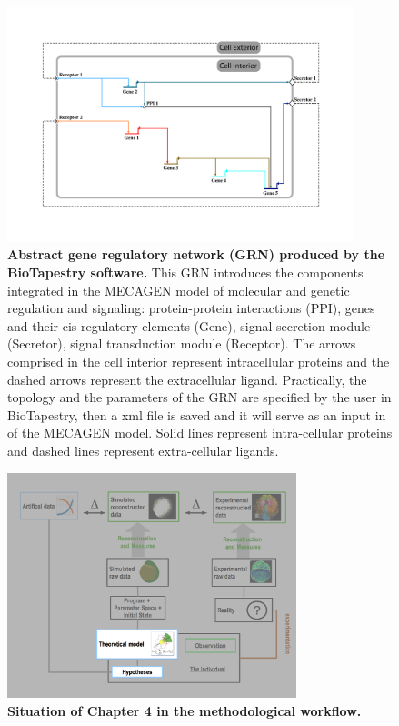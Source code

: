 \begin{figure}
\begin{center}
\includegraphics[width=0.9\textwidth]{../../images/Cases_Studies/Case_theo_grn/generic_grn_cellshape.png}
\end{center}
\caption{\textbf{Abstract gene regulatory network (GRN) produced by the BioTapestry software.} This GRN introduces the components integrated in the MECAGEN model of molecular and genetic regulation and signaling: protein-protein interactions (PPI), genes and their cis-regulatory elements (Gene), signal secretion module (Secretor), signal transduction module (Receptor). The arrows comprised in the cell interior represent intracellular proteins and the dashed arrows represent the extracellular ligand. Practically, the topology and the parameters of the GRN are specified by the user in BioTapestry, then a xml file is saved and it will serve as an input in of the MECAGEN model. Solid lines represent intra-cellular proteins and dashed lines represent extra-cellular ligands.}
\label{Case_theo_grn_generic_grn_cell_shape}
\end{figure}
\begin{figure}
\begin{center}
\includegraphics[width=0.75\textwidth]{../../images/experimental_science/experimental_science_cleaner_focus_theo.png}
\end{center}
\caption{\textbf{Situation of Chapter 4 in the methodological workflow.}}
\label{experimental_science_experimental_science_cleaner_focus_theo_2}
\end{figure}


